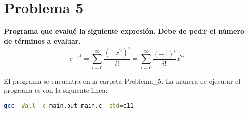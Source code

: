 \section*{Problema 5}
\textbf{Programa que evalué la siguiente expresión. Debe de pedir el número de términos a evaluar.}
\begin{equation*}
    e^{-x^2} = \sum_{i=0}^\infty \frac{(-x^2)^i}{i!} = \sum_{i=0}^\infty \frac{(-1)^i}{i!} x^{2i}
\end{equation*}

El programa se encuentra en la carpeta \textcolor{citecolor}{Problema\_5}. La manera de ejecutar el programa es con la siguiente linea:
\begin{lstlisting}[language=bash]
    gcc -Wall -o main.out main.c -std=c11
\end{lstlisting}